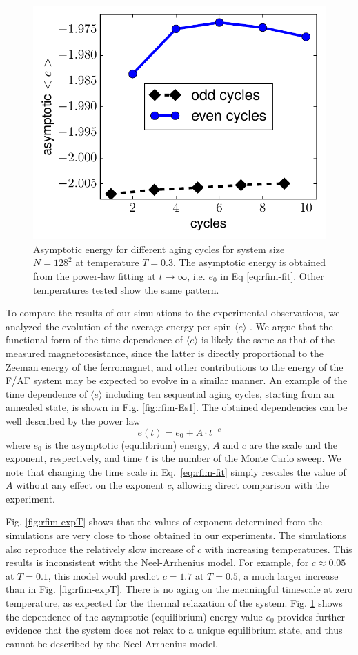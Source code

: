 \begin{figure}
\centering \includegraphics[width=0.5\columnwidth]{Chapter-4/asymptotic_E_T03_10cycles}
\protect\caption{Asymptotic energy for different aging cycles for system size $N=128^2$ at temperature $T=0.3$. The asymptotic energy is obtained from the power-law fitting at $t\rightarrow\infty$, i.e. $e_0$ in Eq \ref{eq:rfim-fit}. Other temperatures tested show the same pattern.} 
\label{fig:rfim-asm}
\end{figure}

To compare the results of our simulations to the experimental observations, we analyzed the evolution of the average
energy per spin $\langle e \rangle$ . We argue that the functional form of the time dependence of $\langle e \rangle$ is likely the same as that of the measured magnetoresistance, since the latter is directly proportional to the Zeeman energy of the ferromagnet, and other contributions to the energy of the F/AF system may be expected to evolve in a similar manner. An example of the time dependence of $\langle e \rangle$ including ten sequential aging cycles, starting from an annealed state, is shown in Fig. \ref{fig:rfim-Es1}. The obtained dependencies can be well described by the power law
\begin{equation}
e(t)=e_{0}+A\cdot  t^{-c}
\label{eq:rfim-fit}
\end{equation}
where $e_{0}$ is the asymptotic (equilibrium) energy, $A$ and $c$ are the scale and the exponent, respectively, and time $t$ is the number of the Monte Carlo sweep. We note that  changing the time scale in Eq.~\ref{eq:rfim-fit} simply rescales the value of $A$ without any effect on the exponent $c$, allowing direct comparison with the experiment. 

Fig. \ref{fig:rfim-expT} shows that the values of exponent determined from the simulations are very close to those obtained in our experiments. The simulations also reproduce the relatively slow increase of $c$ with increasing temperatures. This results is inconsistent witht the Neel-Arrhenius model. For example, for $c \approx 0.05$ at $T=0.1$, this model would predict $c=1.7$ at $T=0.5$, a much larger increase than in Fig. \ref{fig:rfim-expT}. There is no aging on the meaningful timescale at zero temperature, as expected for the thermal relaxation of the system. Fig. \ref{fig:rfim-asm} shows the dependence of the asymptotic (equilibrium) energy value $e_0$ provides further evidence that the system does not relax to a unique equilibrium state, and thus cannot be described by the Neel-Arrhenius model.



